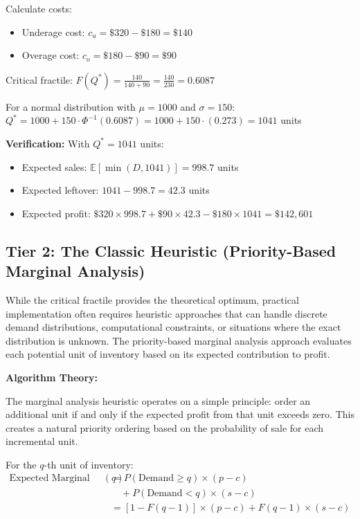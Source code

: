 \documentclass{article}
\begin{document}
Calculate costs:
\begin{itemize}
\item Underage cost: $c_u = \$320 - \$180 = \$140$
\item Overage cost: $c_o = \$180 - \$90 = \$90$
\end{itemize}

Critical fractile: $F(Q^*) = \frac{140}{140 + 90} = \frac{140}{230} = 0.6087$

For a normal distribution with $\mu = 1000$ and $\sigma = 150$:
$Q^* = 1000 + 150 \cdot \Phi^{-1}(0.6087) = 1000 + 150 \cdot (0.273) = 1041$ units

\textbf{Verification:}
With $Q^* = 1041$ units:
\begin{itemize}
\item Expected sales: $\mathbb{E}[\min(D, 1041)] = 998.7$ units
\item Expected leftover: $1041 - 998.7 = 42.3$ units
\item Expected profit: $\$320 \times 998.7 + \$90 \times 42.3 - \$180 \times 1041 = \$142,601$
\end{itemize}

\subsection{Tier 2: The Classic Heuristic (Priority-Based Marginal Analysis)}

While the critical fractile provides the theoretical optimum, practical implementation often requires heuristic approaches that can handle discrete demand distributions, computational constraints, or situations where the exact distribution is unknown. The priority-based marginal analysis approach evaluates each potential unit of inventory based on its expected contribution to profit.

\textbf{Algorithm Theory:}

The marginal analysis heuristic operates on a simple principle: order an additional unit if and only if the expected profit from that unit exceeds zero. This creates a natural priority ordering based on the probability of sale for each incremental unit.

For the $q$-th unit of inventory:
\begin{align}
\text{Expected Marginal Profit}(q) &= P(\text{Demand} \geq q) \times (p-c) \\
&\quad + P(\text{Demand} < q) \times (s-c)\\
&= [1-F(q-1)] \times (p-c) + F(q-1) \times (s-c)
\end{align}
\end{document}
